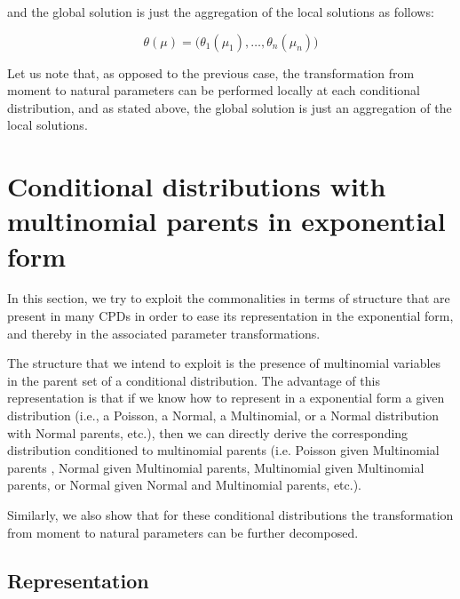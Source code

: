 \documentclass[11pt, oneside]{article}   	%
\numberwithin{figure}{section}
\numberwithin{equation}{section}
\numberwithin{table}{section}
\theoremstyle{definition}
\begin{document}
\noindent and the global solution is just the aggregation of the local solutions as follows: 

$$ \theta(\mu) = \big(\theta_1(\mu_1), \ldots, \theta_n(\mu_n)\big)$$

Let us note that, as opposed to the previous case, the transformation from moment to natural parameters can be performed locally at each conditional distribution, and as stated above, the global solution is just an aggregation of the local solutions.

\section{Conditional distributions with multinomial parents in exponential form}\label{Section:CD_With_MParents}

In this section, we try to exploit the commonalities in terms of structure that are present in many CPDs in order to ease its representation in the exponential form, and thereby in the associated parameter transformations.  

The structure that we intend to exploit is the presence of multinomial variables in the parent set of a conditional distribution. The advantage of this representation is that if we know how to represent in a exponential form a given distribution (i.e., a Poisson, a Normal, a Multinomial, or a Normal distribution with Normal parents, etc.), then we can directly derive the corresponding distribution conditioned to multinomial parents (i.e. Poisson given Multinomial parents , Normal given Multinomial parents, Multinomial given Multinomial parents, or Normal given Normal and Multinomial parents, etc.). 

Similarly, we also show that for these conditional distributions the transformation from moment to natural parameters can be further decomposed. 

\subsection{Representation} \label{Section:CD_With_MParents:Representation}
\end{document}
